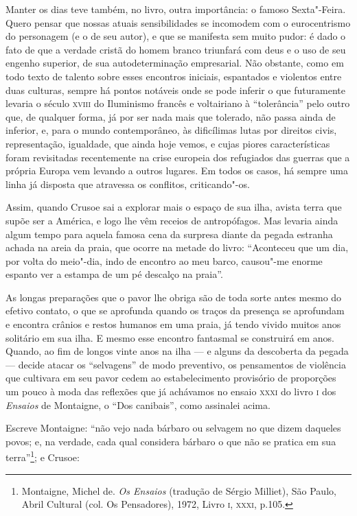 Manter os dias teve também, no livro, outra importância: o famoso
Sexta"-Feira. Quero pensar que nossas atuais sensibilidades se incomodem
com o eurocentrismo do personagem (e o de seu autor), e que se manifesta
sem muito pudor: é dado o fato de que a verdade cristã do homem branco
triunfará com deus e o uso de seu engenho superior, de sua
autodeterminação empresarial. Não obstante, como em todo texto de
talento sobre esses encontros iniciais, espantados e violentos entre
duas culturas, sempre há pontos notáveis onde se pode inferir o que
futuramente levaria o século \textsc{xviii} do Iluminismo francês e voltairiano à
``tolerância'' pelo outro que, de qualquer forma, já por ser nada mais
que tolerado, não passa ainda de inferior, e, para o mundo
contemporâneo, às dificílimas lutas por direitos civis, representação,
igualdade, que ainda hoje vemos, e cujas piores características foram
revisitadas recentemente na crise europeia dos refugiados das guerras
que a própria Europa vem levando a outros lugares. Em todos os casos, há
sempre uma linha já disposta que atravessa os conflitos, criticando"-os.

Assim, quando Crusoe sai a explorar mais o espaço de sua ilha, avista
terra que supõe ser a América, e logo lhe vêm receios de antropófagos.
Mas levaria ainda algum tempo para aquela famosa cena da surpresa diante
da pegada estranha achada na areia da praia, que ocorre na metade do
livro: ``Aconteceu que um dia, por volta do meio"-dia, indo de encontro
ao meu barco, causou"-me enorme espanto ver a estampa de um pé descalço
na praia''.

As longas preparações que o pavor lhe obriga são de toda sorte antes
mesmo do efetivo contato, o que se aprofunda quando os traços da
presença se aprofundam e encontra crânios e restos humanos em uma praia,
já tendo vivido muitos anos solitário em sua ilha. E mesmo esse encontro
fantasmal se construirá em anos. Quando, ao fim de longos vinte anos na
ilha --- e alguns da descoberta da pegada --- decide atacar os
``selvagens'' de modo preventivo, os pensamentos de violência que
cultivara em seu pavor cedem ao estabelecimento provisório de proporções
um pouco à moda das reflexões que já achávamos no ensaio \textsc{xxxi} do livro \textsc{i}
dos \emph{Ensaios} de Montaigne, o ``Dos canibais'', como assinalei
acima.

Escreve Montaigne: ``não vejo nada bárbaro ou selvagem no que dizem
daqueles povos; e, na verdade, cada qual considera bárbaro o que não se
pratica em sua terra''\footnote{Montaigne, Michel de. \emph{Os Ensaios}
  (tradução de Sérgio Milliet), São Paulo, Abril Cultural (col. Os
  Pensadores), 1972, Livro \textsc{i}, \textsc{xxxi}, p.105.}; e Crusoe:


